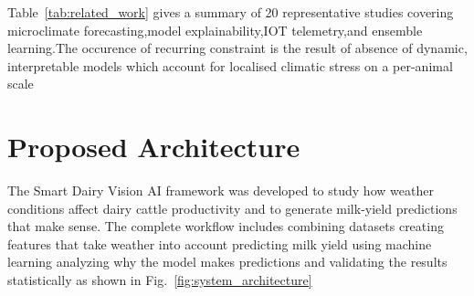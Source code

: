 \documentclass[conference]{IEEEtran}
\begin{document}
	Table~\ref{tab:related_work} gives a summary of 20 representative studies covering microclimate forecasting,model explainability,IOT telemetry,and ensemble learning.The occurence of recurring constraint is the result of absence of dynamic, interpretable models which account for localised climatic stress on a per-animal scale
	
	
	\section{Proposed Architecture}
	The Smart Dairy Vision AI framework was developed to study how weather conditions affect dairy cattle productivity and to generate milk-yield predictions that make sense. The complete workflow includes combining datasets creating features that take weather into account predicting milk yield using machine learning analyzing why the model makes predictions and validating the results statistically as shown in Fig.~\ref{fig:system_architecture}
	
	
\end{document}
